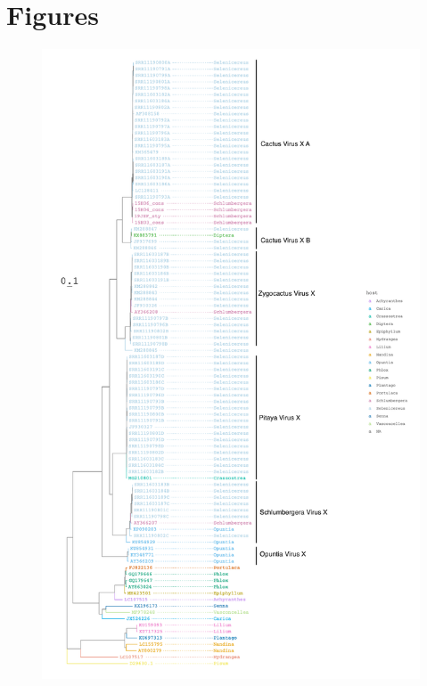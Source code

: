 \documentclass[11pt,letterpaper,titlepage]{article}
\begin{document}
\section*{Figures}


 \begin{figure}[ht]
 \centering
 \includegraphics[width=0.5\linewidth]{../images/full_bootstrap_tree.pdf}
 \begin{NoHyper}
 \caption{{\fontsize{10pt}{11pt}\selectfont}
 \label{Phylogeny}
 \end{NoHyper}
 \end{figure}


\end{document}
